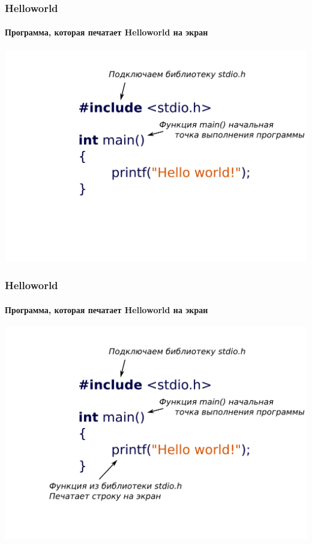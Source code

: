 \documentclass[12pt,pdf,hyperref={unicode}]{beamer}
\begin{document}
\begin{frame}[fragile]
\frametitle{Helloworld} 
\framesubtitle{Программа, которая печатает Helloworld на экран} 
\begin{center}
\includegraphics[width=0.99\linewidth]{images/hw3.png}
\end{center}
\end{frame}


\begin{frame}[fragile]
\frametitle{Helloworld} 
\framesubtitle{Программа, которая печатает Helloworld на экран} 
\begin{center}
\includegraphics[width=0.99\linewidth]{images/hw4.png}
\end{center}
\end{frame}
\end{document}
